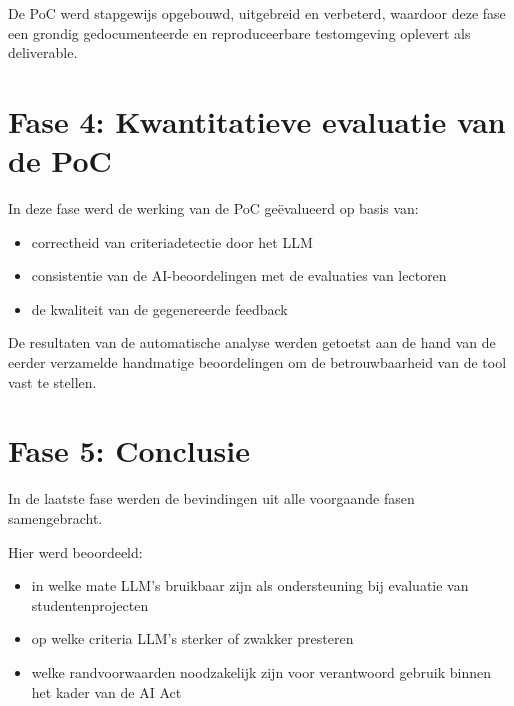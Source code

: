 De PoC werd stapgewijs opgebouwd, uitgebreid en verbeterd, waardoor deze fase een grondig gedocumenteerde en reproduceerbare testomgeving oplevert als deliverable.

\section{Fase 4: Kwantitatieve evaluatie van de PoC}

In deze fase werd de werking van de PoC geëvalueerd op basis van:

\begin{itemize}
    \item correctheid van criteriadetectie door het LLM
    \item consistentie van de AI-beoordelingen met de evaluaties van lectoren
    \item de kwaliteit van de gegenereerde feedback
\end{itemize}

De resultaten van de automatische analyse werden getoetst aan de hand van de eerder verzamelde handmatige beoordelingen om de betrouwbaarheid van de tool vast te stellen.


\section{Fase 5: Conclusie}

In de laatste fase werden de bevindingen uit alle voorgaande fasen samengebracht. 

Hier werd beoordeeld:
\begin{itemize}
    \item in welke mate LLM’s bruikbaar zijn als ondersteuning bij evaluatie van studentenprojecten
    \item op welke criteria LLM’s sterker of zwakker presteren
    \item welke randvoorwaarden noodzakelijk zijn voor verantwoord gebruik binnen het kader van de AI Act
\end{itemize}

